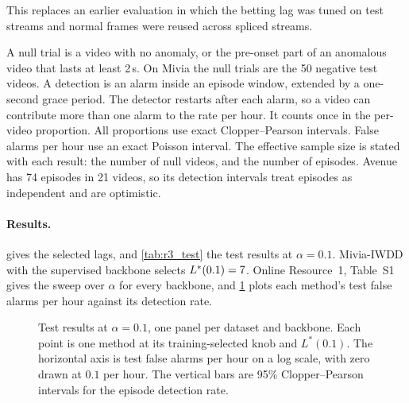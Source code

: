 This replaces an earlier evaluation in which the betting lag was tuned on test
streams and normal frames were reused across spliced streams.

A null trial is a video with no anomaly, or the pre-onset part of an anomalous
video that lasts at least 2\,s. On Mivia the null trials are the 50 negative
test videos. A detection is an alarm inside an episode window, extended by a
one-second grace period. The detector restarts after each alarm, so a video
can contribute more than one alarm to the rate per hour. It counts once in the
per-video proportion. All proportions use exact Clopper--Pearson intervals.
False alarms per hour use an exact Poisson interval. The effective sample size
is stated with each result: the number of null videos, and the number of
episodes. Avenue has 74 episodes in 21 videos, so its detection intervals treat
episodes as independent and are optimistic.

\paragraph{Results.}  gives the selected lags, and
\cref{tab:r3_test} the test results at $\alpha=0.1$. Mivia-IWDD with the supervised
backbone selects $L^\ast(0.1)=7{}$. Online Resource~1, Table~S1 gives
the sweep over $\alpha$ for every backbone, and \cref{fig:r3_per_video} plots each
method's test false alarms per hour against its detection rate.



\begin{figure}[t]
  \centering
  \caption{Test results at $\alpha=0.1$, one panel per dataset and backbone.
  Each point is one method at its training-selected knob and $L^\ast(0.1)$.
  The horizontal axis is test false alarms per hour on a log scale, with zero
  drawn at $0.1$ per hour. The vertical bars are 95\% Clopper--Pearson
  intervals for the episode detection rate.}
  \label{fig:r3_per_video}
\end{figure}

